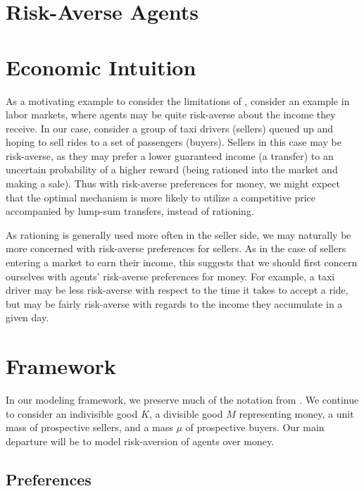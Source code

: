 \documentclass[AER]{AEA}
\begin{document}

\section{Risk-Averse Agents}

\section{Economic Intuition}

As a motivating example to consider the limitations of \cite{dworczak-2020}, consider an example in labor markets, where agents may be quite risk-averse about the income they receive. In our case, consider a group of taxi drivers (sellers) queued up and hoping to sell rides to a set of passengers (buyers). Sellers in this case may be risk-averse, as they may prefer a lower guaranteed income (a transfer) to an uncertain probability of a higher reward (being rationed into the market and making a sale). Thus with risk-averse preferences for money, we might expect that the optimal mechanism is more likely to utilize a competitive price accompanied by lump-sum transfers, instead of rationing.

As rationing is generally used more often in the seller side, we may naturally be more concerned with risk-averse preferences for sellers. As in the case of sellers entering a market to earn their income, this suggests that we should first concern ourselves with agents' risk-averse preferences for money. For example, a taxi driver may be less risk-averse with respect to the time it takes to accept a ride, but may be fairly risk-averse with regards to the income they accumulate in a given day.

\section{Framework}

In our modeling framework, we preserve much of the notation from \cite{dworczak-2020}. We continue to consider an indivisible good $K$, a divisible good $M$ representing money, a unit mass of prospective sellers, and a mass $\mu$ of prospective buyers. Our main departure will be to model risk-aversion of agents over money.

\subsection{Preferences}
\end{document}

